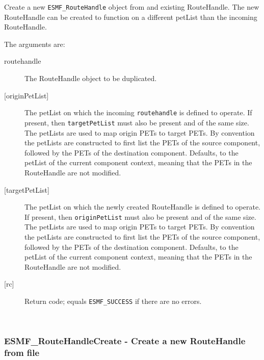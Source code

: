      Create a new {\tt ESMF\_RouteHandle} object from and existing RouteHandle.
     The new RouteHandle can be created to function on a different petList than
     the incoming RouteHandle.
  
     The arguments are:
     \begin{description}
     \item[routehandle]
       The RouteHandle object to be duplicated.
     \item[{[originPetList]}]
       \begin{sloppypar}
       The petList on which the incoming {\tt routehandle} is defined to operate.
       If present, then {\tt targetPetList} must also be present and of the same
       size. The petLists are used to map origin PETs to target PETs. By 
       convention the petLists are constructed to first list the PETs of the
       source component, followed by the PETs of the destination component.
       Defaults, to the petList of the current component context, meaning that 
       the PETs in the RouteHandle are not modified.
       \end{sloppypar}
     \item[{[targetPetList]}]
       \begin{sloppypar}
       The petList on which the newly created RouteHandle is defined to operate.
       If present, then {\tt originPetList} must also be present and of the same
       size. The petLists are used to map origin PETs to target PETs. By 
       convention the petLists are constructed to first list the PETs of the
       source component, followed by the PETs of the destination component.
       Defaults, to the petList of the current component context, meaning that 
       the PETs in the RouteHandle are not modified.
       \end{sloppypar}
     \item[{[rc]}]
       Return code; equals {\tt ESMF\_SUCCESS} if there are no errors.
     \end{description}
   
 
\mbox{}\hrulefill\ 
 
\subsubsection [ESMF\_RouteHandleCreate] {ESMF\_RouteHandleCreate - Create a new RouteHandle from file}


